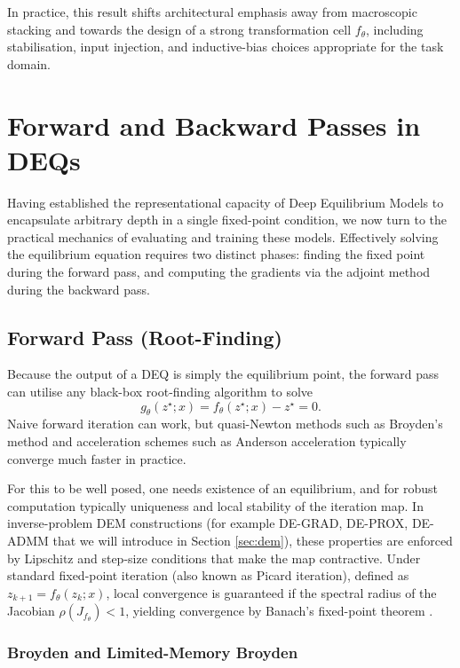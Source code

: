 In practice, this result shifts architectural emphasis away from macroscopic stacking and towards the design of a strong transformation cell $f_\theta$, including stabilisation, input injection, and inductive-bias choices appropriate for the task domain.

\section{Forward and Backward Passes in DEQs}

Having established the representational capacity of Deep Equilibrium Models to encapsulate arbitrary depth in a single fixed-point condition, we now turn to the practical mechanics of evaluating and training these models. Effectively solving the equilibrium equation requires two distinct phases: finding the fixed point during the forward pass, and computing the gradients via the adjoint method during the backward pass.

\subsection{Forward Pass (Root-Finding)}
Because the output of a DEQ is simply the equilibrium point, the forward pass can utilise any black-box root-finding algorithm to solve
\begin{equation*}
    g_\theta(z^\star; x) = f_\theta(z^\star; x) - z^\star = 0.
\end{equation*}
Naive forward iteration can work, but quasi-Newton methods such as Broyden's method and acceleration schemes such as Anderson acceleration typically converge much faster in practice.

For this to be well posed, one needs existence of an equilibrium, and for robust computation typically uniqueness and local stability of the iteration map. In inverse-problem DEM constructions (for example DE-GRAD, DE-PROX, DE-ADMM that we will introduce in Section \ref{sec:dem}), these properties are enforced by Lipschitz and step-size conditions that make the map contractive. Under standard fixed-point iteration (also known as Picard iteration), defined as $z_{k+1} = f_\theta(z_k; x)$, local convergence is guaranteed if the spectral radius of the Jacobian $\rho(J_{f_\theta}) < 1$, yielding convergence by Banach's fixed-point theorem \cite{gilton2021deep, riccio2022regularization}.

\subsubsection*{Broyden and Limited-Memory Broyden}

